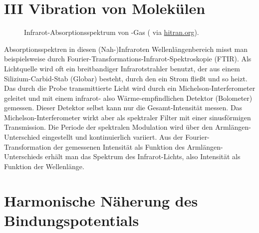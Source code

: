 






\section{III Vibration von Molekülen }


\begin{figure}
\caption{Infrarot-Absorptionsspektrum von -Gas  (\cite{Maki_1995_HCN} via \href{https://hitran.org}{hitran.org}).
\label{fig:vib_hcn}}
\end{figure}




Absorptionsspektren in diesen (Nah-)Infraroten Wellenlängenbereich misst man beispielsweise durch Fourier-Transformations-Infrarot-Spektroskopie (FTIR). Als Lichtquelle wird oft ein breitbandiger Infrarotstrahler benutzt, der aus einem Silizium-Carbid-Stab (Globar) besteht, durch den ein Strom fließt und so heizt. Das durch die Probe transmittierte Licht wird durch ein Michelson-Interferometer geleitet und mit einem infrarot-  also Wärme-empfindlichen Detektor (Bolometer) gemessen. Dieser Detektor selbst kann nur die Gesamt-Intensität messen. Das Michelson-Interferometer wirkt aber als spektraler Filter mit einer sinusförmigen Transmission. Die Periode der spektralen Modulation wird über den Armlängen-Unterschied eingestellt und kontinuierlich variiert. Aus der Fourier-Transformation der gemessenen Intensität als Funktion des Armlängen-Unterschieds erhält man das Spektrum des Infrarot-Lichts, also Intensität als Funktion der Wellenlänge.



\section{Harmonische Näherung des Bindungspotentials}

